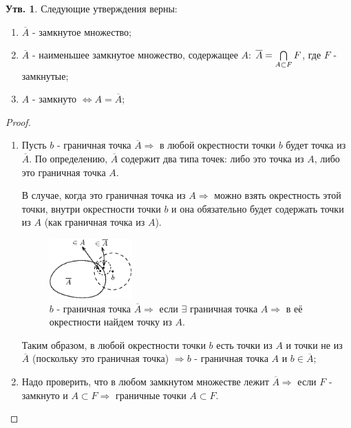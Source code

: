 \documentclass[12pt]{article}
\theoremstyle{definition}
\newtheorem{prop}{Утв.}
\begin{document}
\begin{prop}
	Следующие утверждения верны:
	\begin{enumerate}[label ={\arabic*)}] 
		\item $\overline{A}$ - замкнутое множество;
		\item $\overline{A}$ - наименьшее замкнутое множество, содержащее $A$:  $\overline{A} =  \bigcap\limits_{A \subset F}F \vspace{-\parskip}$, где $F$ - замкнутые;
		\item $A$ - замкнуто $\Leftrightarrow A = \overline{A}$;
	\end{enumerate}
\end{prop}
\begin{proof}\hfill
	\begin{enumerate}[label ={\arabic*)}]
		\item Пусть $b$ - граничная точка $\overline{A} \Rightarrow$ в любой окрестности точки $b$ будет точка из $\overline{A}$. По определению, $\overline{A}$ содержит два типа точек: либо это точка из $A$, либо это граничная точка $A$. 
		
		В случае, когда это граничная точка из $A \Rightarrow$ можно взять окрестность этой точки, внутри окрестности точки $b$ и она обязательно будет содержать точки из $A$ (как граничная точка из $A$). 
		\begin{figure}[H]
			\centering
			\includegraphics[width=0.3\textwidth]{7_8.eps}
			\caption{$b$ - граничная точка $\overline{A} \Rightarrow$ если $\exists$ граничная точка $A \Rightarrow$ в её окрестности найдем точку из $A$.}
			\label{7_8}
		\end{figure}
		Таким образом, в любой окрестности точки $b$ есть точки из $A$ и точки не из $\overline{A}$ (поскольку это граничная точка) $\Rightarrow b$ - граничная точка $A$ и $b \in \overline{A}$;
		
		\item Надо проверить, что в любом замкнутом множестве лежит $\overline{A} \Rightarrow$ если $F$ - замкнуто и $A\subset F \Rightarrow$ граничные точки $A \subset F$.
		

\end{enumerate}
\end{proof}
\end{document}
